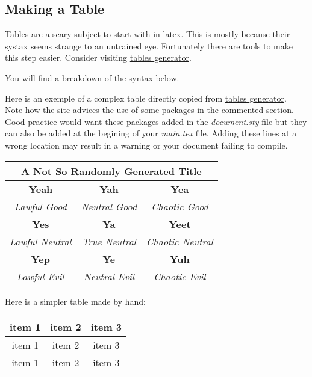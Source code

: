 
\subsection{Making a Table}

Tables are a scary subject to start with in latex.
This is mostly because their systax seems strange to an untrained eye.
Fortunately there are tools to make this step easier.
Consider visiting \href{https://www.tablesgenerator.com/} {tables generator}.

You will find a breakdown of the syntax below.


Here is an exemple of a complex table directly copied from \href{https://www.tablesgenerator.com/} {tables generator}.
\\
Note how the site advices the use of some packages in the commented section.
Good practice would want these packages added in the \textit{document.sty} file but they can also be added at the begining
of your \textit{main.tex} file. Adding these lines at a wrong location may result in a warning or your
document failing to compile.


\begin{table}[h!]
\begin{tabular}{ccc}
\multicolumn{3}{c}{A Not So Randomly Generated Title} \\ \hline
\multicolumn{1}{c|}{\textbf{Yeah}} &
  \multicolumn{1}{c|}{\textbf{Yah}} &
  \textbf{Yea} \\ \hline
\multicolumn{1}{c|}{{\color[HTML]{656565} \textit{Lawful Good}}} &
  \multicolumn{1}{c|}{{\color[HTML]{656565} \textit{Neutral Good}}} &
  {\color[HTML]{656565} \textit{Chaotic Good}} \\ \hline
\multicolumn{1}{c|}{\textbf{Yes}} &
  \multicolumn{1}{c|}{\textbf{Ya}} &
  \textbf{Yeet} \\ \hline
\multicolumn{1}{c|}{{\color[HTML]{656565} \textit{Lawful Neutral}}} &
  \multicolumn{1}{c|}{{\color[HTML]{656565} \textit{True Neutral}}} &
  {\color[HTML]{656565} \textit{Chaotic Neutral}} \\ \hline
\multicolumn{1}{c|}{\textbf{Yep}} &
  \multicolumn{1}{c|}{\textbf{Ye}} &
  \textbf{Yuh} \\ \hline
\multicolumn{1}{c|}{{\color[HTML]{656565} \textit{Lawful Evil}}} &
  \multicolumn{1}{c|}{{\color[HTML]{656565} \textit{Neutral Evil}}} &
  {\color[HTML]{656565} \textit{Chaotic Evil}}
\end{tabular}
\end{table}


Here is a simpler table made by hand:
\begin{table}[h!]
  \begin{tabular}{c|c|c}
    item 1 &  item 2 &  item 3 \\ \hline
    item 1 &  item 2 &  item 3 \\ \hline
    item 1 &  item 2 &  item 3
  \end{tabular}
\end{table}
